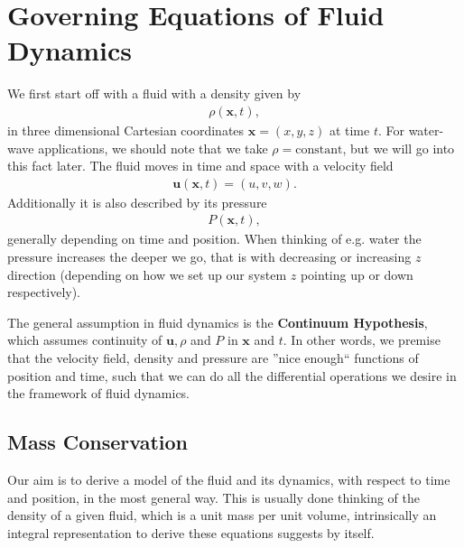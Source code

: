 \section{Governing Equations of Fluid Dynamics}
We first start off with a fluid with a density given by
\begin{align}
    \rho(\mathbf{x}, t),
\end{align}
in three dimensional Cartesian coordinates $\mathbf{x} = (x, y, z)$ at time
$t$. For water-wave applications, we should note that we take
$\rho=\text{constant}$, but we will go into this fact later. The fluid moves
in time and space with a velocity field
\begin{align}
    \mathbf{u}(\mathbf{x}, t) = (u, v, w).
\end{align}
Additionally it is also described by its pressure
\begin{align}
    P(\mathbf{x}, t),
\end{align}
generally depending on time and position. When thinking of e.g. water the
pressure increases the deeper we go, that is with decreasing or increasing $z$
direction (depending on how we set up our system $z$ pointing up or down
respectively).

The general assumption in fluid dynamics is the \textbf{Continuum
Hypothesis}, which assumes continuity of $\textbf{u}, \rho$ and $P$ in
$\mathbf{x}$ and $t$. In other words, we premise that the velocity field,
density and pressure are ''nice enough`` functions of position and time, such
that we can do all the differential operations we desire in the framework of
fluid dynamics.
\subsection{Mass Conservation}
Our aim is to derive a model of the fluid and its dynamics, with respect to
time and position, in the most general way. This is usually done thinking
of the density of a given fluid, which is a unit mass per unit volume,
intrinsically  an integral representation to derive these equations suggests
by itself.

